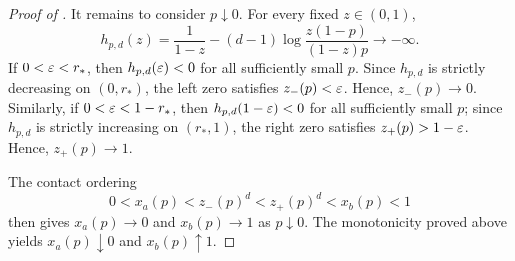 \begin{proof}[Proof of ]
It remains to consider $p\downarrow0$.  For every fixed $z\in(0,1)$,
\[
  h_{p,d}(z)
  =
  \frac1{1-z}-(d-1)\log\frac{z(1-p)}{(1-z)p}
  \longrightarrow -\infty.
\]
If $0<\varepsilon<r_*$, then $h_{p,d}(\varepsilon)<0$ for all sufficiently small $p$.  Since
$h_{p,d}$ is strictly decreasing on $(0,r_*)$, the left zero satisfies
$z_-(p)<\varepsilon$.  Hence, $z_-(p)\to0$.  Similarly, if
$0<\varepsilon<1-r_*$, then $h_{p,d}(1-\varepsilon)<0$ for all sufficiently small $p$; since
$h_{p,d}$ is strictly increasing on $(r_*,1)$, the right zero satisfies
$z_+(p)>1-\varepsilon$.  Hence, $z_+(p)\to1$.

The contact ordering
\[
  0<x_a(p)<z_-(p)^d<z_+(p)^d<x_b(p)<1
\]
then gives $x_a(p)\to0$ and $x_b(p)\to1$ as $p\downarrow0$.
The monotonicity proved above yields $x_a(p)\downarrow0$ and $x_b(p)\uparrow1$.
\end{proof}
